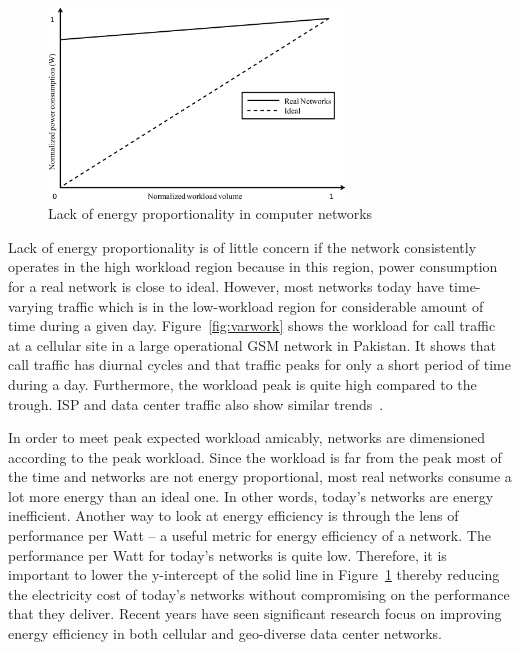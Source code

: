 \begin{figure}
\centering
\includegraphics[width=0.7\textwidth]{pics/enerprop.eps}
\caption{Lack of energy proportionality in computer networks}
\label{fig:ener-prop}
\end{figure} 

Lack of energy proportionality is of little concern if the network consistently operates in the high workload region because in this region, power consumption for a real network is close to ideal. However, most networks today have time-varying traffic which is in the low-workload region for considerable amount of time during a given day. Figure~\ref{fig:varwork} shows the workload for call traffic at a cellular site in a large operational GSM network in Pakistan. It shows that call traffic has diurnal cycles and that traffic peaks for only a short period of time during a day. Furthermore, the workload peak is quite high compared to the trough. ISP and data center traffic also show similar trends~\cite{1248656,10.1109/MC.2007.443}. 

In order to meet peak expected workload amicably, networks are dimensioned according to the peak workload. Since the workload is far from the peak most of the time and networks are not energy proportional, most real networks consume a lot more energy than an ideal one. In other words, today's networks are energy inefficient. Another way to look at energy efficiency is through the lens of performance per Watt -- a useful metric for energy efficiency of a network. The performance per Watt for today's networks is quite low. Therefore, it is important to lower the y-intercept of the solid line in Figure~\ref{fig:ener-prop} thereby reducing the electricity cost of today's networks without compromising on the performance that they deliver. Recent years have seen significant research focus on improving energy efficiency in both cellular and geo-diverse data center networks.

